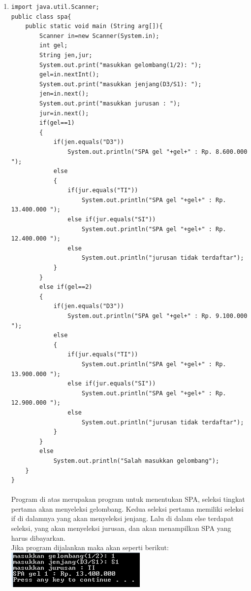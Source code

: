 \documentclass[a4paper,12pt]{article}
\begin{document}
\begin{enumerate}[label=\textbf{\arabic* .}]
        \item
            \begin{lstlisting}[frame=single]
import java.util.Scanner;
public class spa{
    public static void main (String arg[]){
        Scanner in=new Scanner(System.in);
        int gel;
        String jen,jur;
        System.out.print("masukkan gelombang(1/2): ");
        gel=in.nextInt();
        System.out.print("masukkan jenjang(D3/S1): ");
        jen=in.next();
        System.out.print("masukkan jurusan : ");
        jur=in.next();
        if(gel==1)
        {
            if(jen.equals("D3"))
                System.out.println("SPA gel "+gel+" : Rp. 8.600.000 ");
            else
            {
                if(jur.equals("TI"))
                    System.out.println("SPA gel "+gel+" : Rp. 13.400.000 ");
                else if(jur.equals("SI"))
                    System.out.println("SPA gel "+gel+" : Rp. 12.400.000 ");
                else
                    System.out.println("jurusan tidak terdaftar");
            }
        }
        else if(gel==2)
        {
            if(jen.equals("D3"))
                System.out.println("SPA gel "+gel+" : Rp. 9.100.000 ");
            else
            {
                if(jur.equals("TI"))
                    System.out.println("SPA gel "+gel+" : Rp. 13.900.000 ");
                else if(jur.equals("SI"))
                    System.out.println("SPA gel "+gel+" : Rp. 12.900.000 ");
                else
                    System.out.println("jurusan tidak terdaftar");
            }
        }
        else
            System.out.println("Salah masukkan gelombang");
    }
}               
            \end{lstlisting}
            \paragraph{}
            Program di atas merupakan program untuk menentukan SPA, seleksi tingkat pertama akan menyeleksi gelombang. Kedua seleksi pertama memiliki seleksi if
            di dalamnya yang akan menyeleksi jenjang. Lalu di dalam else terdapat seleksi, yang akan menyeleksi jurusan, dan akan menampilkan SPA yang harus 
            dibayarkan.\\
            Jika program dijalankan maka akan seperti berikut:\\
            \includegraphics{06b.PNG}


\end{enumerate}
\end{document}
